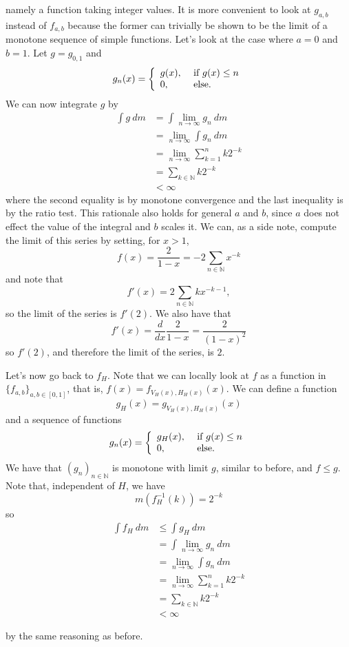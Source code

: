 \documentclass[a4paper,12pt,twoside,BCOR=10mm]{scrbook}
\theoremstyle{definition}
\theoremstyle{definition}
\theoremstyle{definition}
\begin{document}
namely a function taking integer values.
It is more convenient to look at $g_{a, b}$ instead of $f_{a, b}$ because the former can trivially be shown to be the limit of a monotone sequence of simple functions.
Let's look at the case where $a = 0$ and $b = 1$.
Let $g = g_{0, 1}$ and
\[
	g_n(x) = \left \{
	\begin{array}{l l}
	g(x), & \text{ if } g(x) \leq n \\
	0, & \text{ else}.
	\end{array}
	\right .
\]
We can now integrate $g$ by
\begin{align*}
	\int g\ dm
	&= \int \lim_{n \rightarrow \infty} g_n\ dm\\
	&= \lim_{n \rightarrow \infty} \int g_n\ dm\\
	&= \lim_{n \rightarrow \infty} \sum_{k = 1}^n k2^{-k}\\
	&= \sum_{k \in \mathbb{N}} k2^{-k}\\
	&< \infty
\end{align*}
where the second equality is by monotone convergence and the last inequality is by the ratio test.
This rationale also holds for general $a$ and $b$, since $a$ does not effect the value of the integral and $b$ scales it.
We can, as a side note, compute the limit of this series by setting, for $x > 1$,
\[
	f(x) = \frac{2}{1 - x} = -2\sum_{n \in \mathbb{N}} x^{-k}
\]
and note that
\[
	f'(x) = 2\sum_{n \in \mathbb{N}} kx^{-k - 1},
\]
so the limit of the series is $f'(2)$.
We also have that
\[
	f'(x) = \frac{d}{dx}\frac{2}{1 - x} = \frac{2}{(1 - x)^2}
\]
so $f'(2)$, and therefore the limit of the series, is $2$.

Let's now go back to $f_H$.
Note that we can locally look at $f$ as a function in $\{f_{a, b}\}_{a, b \in [0, 1]}$, that is, $f(x) = f_{V_H(x), H_H(x)}(x)$.
We can define a function
\[
	g_H(x) = g_{V_H(x), H_H(x)}(x)
\]
and a sequence of functions
\[
	g_n(x) = \left \{
	\begin{array}{l l}
	g_H(x), & \text{ if } g(x) \leq n \\
	0, & \text{ else}.
	\end{array}
	\right .
\]
We have that $(g_n)_{n \in \mathbb{N}}$ is monotone with limit $g$, similar to before, and $f \leq g$.
Note that, independent of $H$, we have
\[
	m(f_H^{-1}(k)) = 2^{-k}
\]
so
\begin{align*}
\int f_H\ dm
&\leq \int g_H\ dm\\
&= \int \lim_{n \rightarrow \infty} g_n\ dm\\
&= \lim_{n \rightarrow \infty} \int g_n\ dm\\
&= \lim_{n \rightarrow \infty} \sum_{k = 1}^n k2^{-k}\\
&= \sum_{k \in \mathbb{N}} k2^{-k}\\
&< \infty
\end{align*}
\begin{center}
\end{center}
by the same reasoning as before.
\end{document}
